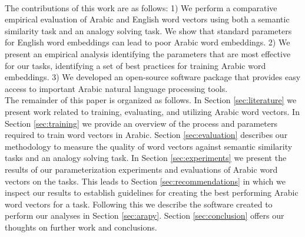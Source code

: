 \\
The contributions of this work are as follows: 1) We perform a comparative empirical evaluation of Arabic and English word vectors using both a semantic similarity task and an analogy solving task. We show that standard parameters for English word embeddings can lead to poor Arabic word embeddings. 2) We present an empirical analysis identifying the parameters that are most effective for our tasks, identifying a set of best practices for training Arabic word embeddings. 3) We developed an open-source software package that provides easy access to important Arabic natural language processing tools. 
\\
The remainder of this paper is organized as follows. In Section \ref{sec:literature} we present work related to training, evaluating, and utilizing Arabic word vectors. In Section \ref{sec:training} we provide an overview of the process and parameters required to train word vectors in Arabic. Section \ref{sec:evaluation} describes our methodology to measure the quality of word vectors against semantic similarity tasks and an analogy solving task. In Section \ref{sec:experiments} we present the results of our parameterization experiments and evaluations of Arabic word vectors on the tasks. This leads to Section \ref{sec:recommendations} in which we inspect our results to establish guidelines for creating the best performing Arabic word vectors for a task. Following this we describe the software created to perform our analyses in Section \ref{sec:arapy}. Section \ref{sec:conclusion} offers our thoughts on further work and conclusions.
